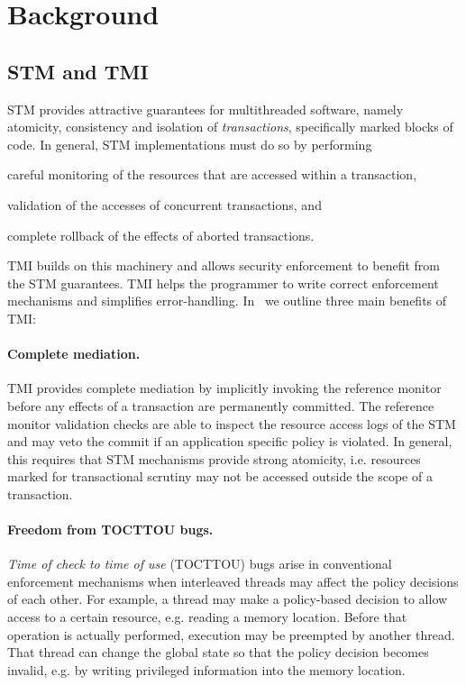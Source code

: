 \section{Background} %
\label{sec:background}

\subsection{STM and TMI} %
\label{sub:stm_and_tmi}

STM provides attractive guarantees for multithreaded software, namely atomicity,
consistency and isolation of {\em transactions}, specifically marked blocks of code.
In general, STM implementations must do so by performing

\begin{mybullet}
    \item careful monitoring of the resources that are accessed within a transaction,
    \item validation of the accesses of concurrent transactions, and
    \item complete rollback of the effects of aborted transactions.
\end{mybullet}

TMI builds on this machinery and allows security enforcement to benefit from
the STM guarantees. TMI helps the programmer to write correct enforcement mechanisms
and simplifies error-handling. In~\cite{tmi} we outline three main benefits of TMI:

\paragraph{Complete mediation.} TMI provides complete mediation by implicitly invoking
the reference monitor before any effects of a transaction are permanently committed. The
reference monitor validation checks
are able to inspect the resource access logs of the STM and may veto the
commit if an application specific policy is violated. 
In general, this requires that STM mechanisms provide
strong atomicity, i.e. resources marked for transactional scrutiny may not be accessed outside
the scope of a transaction.

\paragraph{Freedom from TOCTTOU bugs.} {\em Time of check to time of use} (TOCTTOU) bugs arise
in conventional enforcement mechanisms when interleaved threads may affect the policy decisions
of each other. For example, a thread may make a policy-based decision to allow access to a
certain resource, e.g. reading a memory location. Before that operation is actually performed, 
execution may be preempted by another thread. That thread can change the global state so that the 
policy decision becomes invalid,
e.g. by writing privileged information into the memory location.

